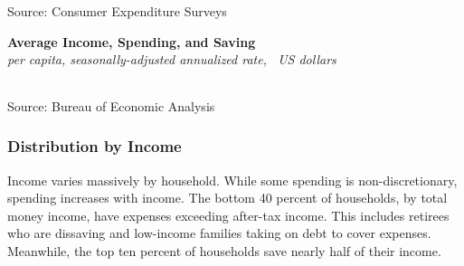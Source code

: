 \documentclass{report}
\makeatletter
\newcommand{\tbllink}[1]{\href{https://raw.githubusercontent.com/bdecon/US-chartbook/master/chartbook/data/#1}{\faTable}}
\newcommand*\short[1]{\expandafter\@gobbletwo\number\numexpr#1\relax}
\newcommand{\absnode}[3]{\node[below right, align=left] at (axis cs: #1,#2) {#3};}
\newcommand{\shdateaxisticks}{
		date coordinates in=x, axis line style={draw=none},
		xmax={2023-10-01},
		max space between ticks=40,	    
		xtick={{1990-01-01}, {1995-01-01}, {2000-01-01}, 
			{2005-01-01}, {2010-01-01}, {2015-01-01}, {2020-01-01}},
		minor xtick={},
		enlarge y limits={0.06}, enlarge x limits={0.01},
		}
\newcommand{\bbar}[2]{extra #1 ticks = {{#2}}, extra #1 tick labels = ,
		extra #1 tick style = {grid=major, grid style={thick, black!25}},}
\newcommand{\thickline}[4]{\addplot[ultra thick, no markers, color=#1] 
		table [x=#2, y=#3, col sep=comma] {#4};	}
\newcommand{\rbars}{
		\fill[color=black!10] (axis cs:{1990-07-01},\pgfkeysvalueof{/pgfplots/ymin}) rectangle 
			(axis cs:{1991-03-01}, \pgfkeysvalueof{/pgfplots/ymax});
		\fill[color=black!10] (axis cs:{2007-12-01},\pgfkeysvalueof{/pgfplots/ymin}) rectangle 
			(axis cs:{2009-07-01}, \pgfkeysvalueof{/pgfplots/ymax});
		\fill[color=black!10] (axis cs:{2001-03-01},\pgfkeysvalueof{/pgfplots/ymin}) rectangle 
			(axis cs:{2001-11-01}, \pgfkeysvalueof{/pgfplots/ymax});
		\fill[color=black!10] (axis cs:{2020-02-01},\pgfkeysvalueof{/pgfplots/ymin}) rectangle 
			(axis cs:{2020-05-01}, \pgfkeysvalueof{/pgfplots/ymax});}
\makeatother
\begin{document}
{\begin{minipage}{0.435\textwidth}
\hspace{4mm} 

\footnotesize{Source: Consumer Expenditure Surveys} \hfill \tbllink{medincexp.csv}
\end{minipage}
\vspace{7mm}

\begin{minipage}{0.76\textwidth}
\normalsize \textbf{Average Income, Spending, and Saving}\\
\footnotesize{\textit{per capita, seasonally-adjusted annualized rate, \unskip \ US dollars}}\\
\hspace*{-2mm}  \setlength{\tabcolsep}{2.6pt} \color{black!90}
		{\renewcommand{\arraystretch}{1.6}
		 \begin{tabular}{p{33mm} R{13mm} R{12mm} R{12mm} R{12mm} R{12mm} R{12mm}}
			  \hline
		\end{tabular}}
		\vspace{-2mm}
		
\footnotesize{Source: Bureau of Economic Analysis}
\end{minipage}
\newpage
\begin{minipage}{0.76\textwidth}  
\subsubsection*{Distribution by Income} 
\small Income varies massively by household. While some spending is non-discretionary, spending increases with income. The bottom 40 percent of households, by total money income, have expenses exceeding after-tax income. This includes retirees who are dissaving and low-income families taking on debt to cover expenses. Meanwhile, the top ten percent of households save nearly half of their income.


\end{minipage}}
\end{document}

